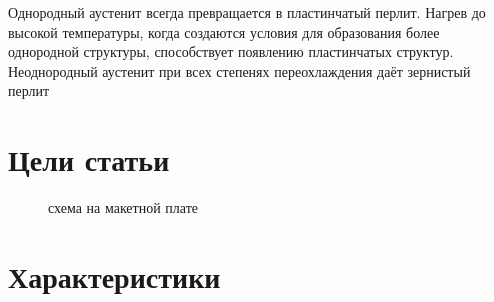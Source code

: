 \documentclass[a4paper, 14pt]{article}
\begin{document}
	Однородный аустенит всегда превращается в пластинчатый перлит. Нагрев до высокой температуры, когда создаются условия для 
	образования более однородной структуры, способствует появлению пластинчатых структур. Неоднородный аустенит при всех степенях переохлаждения даёт зернистый перлит

	
	\newpage
	\section{Цели статьи}
	\begin{figure}[h!]
		\centering
		\caption{схема  на макетной плате}
	\end{figure}
	
	\section{Характеристики}
\end{document}
